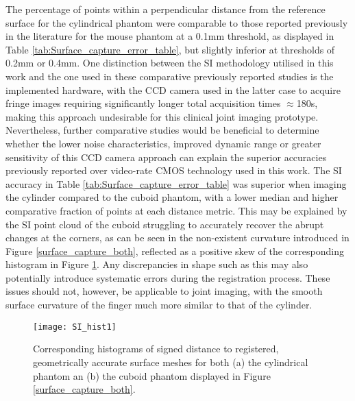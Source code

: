 \documentclass[twoside]{bhamthesis}
\theoremstyle{definition}
\begin{document}
The percentage of points within a perpendicular distance from the reference surface for the cylindrical phantom were comparable to those reported previously in the literature for the mouse phantom at a 0.1mm threshold, as displayed in Table \ref{tab:Surface_capture_error_table}, but slightly inferior at thresholds of 0.2mm or 0.4mm. One distinction between the SI methodology utilised in this work and the one used in these comparative previously reported studies is the implemented hardware, with the CCD camera used in the latter case to acquire fringe images requiring significantly longer total acquisition times $\approx$180s, making this approach undesirable for this clinical joint imaging prototype. Nevertheless, further comparative studies would be beneficial to determine whether the lower noise characteristics, improved dynamic range or greater sensitivity of this CCD camera approach can explain the superior accuracies previously reported over video-rate CMOS technology used in this work. The SI accuracy in Table \ref{tab:Surface_capture_error_table} was superior when imaging the cylinder compared to the cuboid phantom, with a lower median and higher comparative fraction of points at each distance metric. This may be explained by the SI point cloud of the cuboid struggling to accurately recover the abrupt changes at the corners, as can be seen in the non-existent curvature introduced in Figure \ref{surface_capture_both}, reflected as a positive skew of the corresponding histogram in Figure \ref{histograms}. Any discrepancies in shape such as this may also potentially introduce systematic errors during the registration process. These issues should not, however, be applicable to joint imaging, with the smooth surface curvature of the finger much more similar to that of the cylinder.

\begin{figure}[!ht]
\texttt{[image: SI\_hist1]}
\centering
\caption{Corresponding histograms of signed distance to registered, geometrically accurate surface meshes for both (a) the cylindrical phantom an (b) the cuboid phantom displayed in Figure \ref{surface_capture_both}.}
\centering
\label{histograms}
\end{figure}


\end{document}
